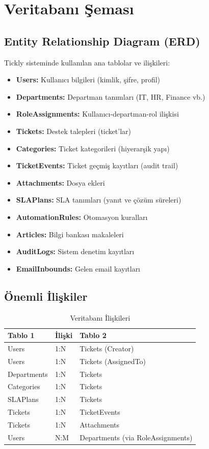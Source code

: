 \documentclass[12pt,a4paper]{article}
\begin{document}
\newpage

\section{Veritabanı Şeması}

\subsection{Entity Relationship Diagram (ERD)}

Tickly sisteminde kullanılan ana tablolar ve ilişkileri:

\begin{itemize}
    \item \textbf{Users:} Kullanıcı bilgileri (kimlik, şifre, profil)
    \item \textbf{Departments:} Departman tanımları (IT, HR, Finance vb.)
    \item \textbf{RoleAssignments:} Kullanıcı-departman-rol ilişkisi
    \item \textbf{Tickets:} Destek talepleri (ticket'lar)
    \item \textbf{Categories:} Ticket kategorileri (hiyerarşik yapı)
    \item \textbf{TicketEvents:} Ticket geçmiş kayıtları (audit trail)
    \item \textbf{Attachments:} Dosya ekleri
    \item \textbf{SLAPlans:} SLA tanımları (yanıt ve çözüm süreleri)
    \item \textbf{AutomationRules:} Otomasyon kuralları
    \item \textbf{Articles:} Bilgi bankası makaleleri
    \item \textbf{AuditLogs:} Sistem denetim kayıtları
    \item \textbf{EmailInbounds:} Gelen email kayıtları
\end{itemize}

\subsection{Önemli İlişkiler}

\begin{table}[h]
\centering
\begin{tabular}{|p{4cm}|p{3cm}|p{6cm}|}
\hline
\textbf{Tablo 1} & \textbf{İlişki} & \textbf{Tablo 2} \\
\hline
Users & 1:N & Tickets (Creator) \\
Users & 1:N & Tickets (AssignedTo) \\
Departments & 1:N & Tickets \\
Categories & 1:N & Tickets \\
SLAPlans & 1:N & Tickets \\
Tickets & 1:N & TicketEvents \\
Tickets & 1:N & Attachments \\
Users & N:M & Departments (via RoleAssignments) \\
\hline
\end{tabular}
\caption{Veritabanı İlişkileri}
\end{table}
\end{document}
